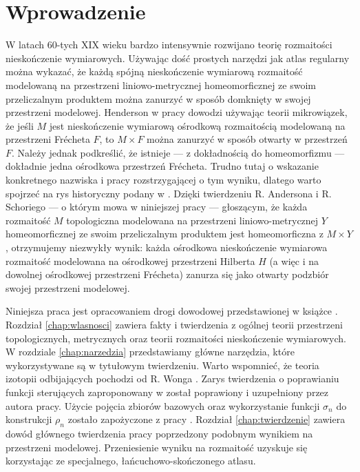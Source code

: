 \section{Wprowadzenie}
W latach 60-tych XIX wieku bardzo intensywnie rozwijano teorię rozmaitości nieskończenie wymiarowych. Używając dość prostych narzędzi jak atlas regularny można wykazać, że każdą spójną nieskończenie wymiarową rozmaitość modelowaną na przestrzeni liniowo-metrycznej homeomorficznej ze swoim przeliczalnym produktem można zanurzyć w sposób domknięty w swojej przestrzeni modelowej. Henderson w pracy \cite{hen} dowodzi używając teorii mikrowiązek, że jeśli $M$ jest nieskończenie wymiarową ośrodkową rozmaitością modelowaną na przestrzeni Frécheta $F$, to $M\times F$ można zanurzyć w sposób otwarty w przestrzeń $F$. Należy jednak podkreślić, że istnieje --- z dokładnością do homeomorfizmu --- dokładnie jedna ośrodkowa przestrzeń Frécheta. Trudno tutaj o wskazanie konkretnego nazwiska i pracy rozstrzygającej o tym wyniku, dlatego warto spojrzeć na rys historyczny podany w \cite{bp}. Dzięki twierdzeniu R. Andersona i R. Schoriego --- o którym mowa w niniejszej pracy --- głoszącym, że każda rozmaitość $M$ topologiczna modelowana na przestrzeni liniowo-metrycznej $Y$ homeomorficznej ze swoim przeliczalnym produktem jest homeomorficzna z $M\times Y$, otrzymujemy niezwykły wynik: każda ośrodkowa nieskończenie wymiarowa rozmaitość modelowana na ośrodkowej przestrzeni Hilberta $H$ (a więc i na dowolnej ośrodkowej przestrzeni Frécheta) zanurza się jako otwarty podzbiór swojej przestrzeni modelowej.

Niniejsza praca jest opracowaniem drogi dowodowej przedstawionej w książce \cite{bp}. Rozdział \ref{chap:wlasnosci} zawiera fakty i twierdzenia z ogólnej teorii przestrzeni topologicznych, metrycznych oraz teorii rozmaitości nieskończenie wymiarowych. W rozdziale \ref{chap:narzedzia} przedstawiamy główne narzędzia, które wykorzystywane są w tytułowym twierdzeniu. Warto wspomnieć, że teoria izotopii odbijających pochodzi od R. Wonga \cite{won}. Zarys twierdzenia o poprawianiu funkcji sterujących zaproponowany w \cite{bp} został poprawiony i uzupełniony przez autora pracy. Użycie pojęcia zbiorów bazowych oraz wykorzystanie funkcji $\sigma_n$ do konstrukcji $\rho_n$ zostało zapożyczone z pracy \cite{sch}. Rozdział \ref{chap:twierdzenie} zawiera dowód głównego twierdzenia pracy poprzedzony podobnym wynikiem na przestrzeni modelowej. Przeniesienie wyniku na rozmaitość uzyskuje się korzystając ze specjalnego, łańcuchowo-skończonego atlasu.